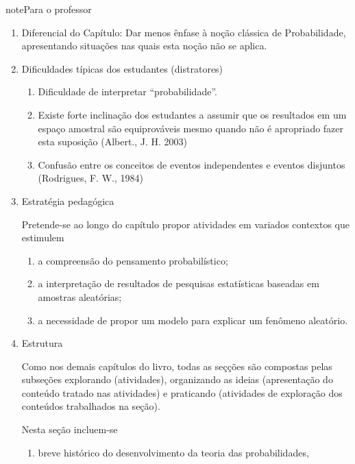 \begin{sphinxadmonition}{note}{Para o professor}
\begin{enumerate}
\item {} 
Diferencial do Capítulo: Dar menos ênfase à noção clássica de Probabilidade, apresentando situações nas quais esta noção não se aplica.

\item {} 
Dificuldades típicas dos estudantes (distratores)
\begin{enumerate}
\item {} 
Dificuldade de interpretar  “probabilidade”.

\item {} 
Existe forte inclinação dos estudantes a assumir que os resultados em um espaço amostral são equiprováveis mesmo quando não é apropriado fazer esta suposição (Albert., J. H. 2003)

\item {} 
Confusão entre os conceitos de eventos independentes e eventos disjuntos (Rodrigues, F. W., 1984)

\end{enumerate}

\item {} 
Estratégia pedagógica

Pretende-se ao longo do capítulo propor atividades em variados contextos que estimulem
\begin{enumerate}
\item {} 
a compreensão do pensamento probabilístico;

\item {} 
a interpretação de resultados de pesquisas estatísticas baseadas em amostras aleatórias;

\item {} 
a necessidade de propor um modelo para explicar um fenômeno aleatório.

\end{enumerate}

\item {} 
Estrutura

Como nos demais capítulos do livro, todas as seçções são compostas pelas subseções explorando (atividades), organizando as ideias (apresentação do conteúdo tratado nas atividades) e praticando (atividades de exploração dos conteúdos trabalhados na seção).


Nesta seção incluem-se
\begin{enumerate}
\item {} 
breve histórico do desenvolvimento da teoria das probabilidades,


\end{enumerate}
\end{enumerate}
\end{sphinxadmonition}

